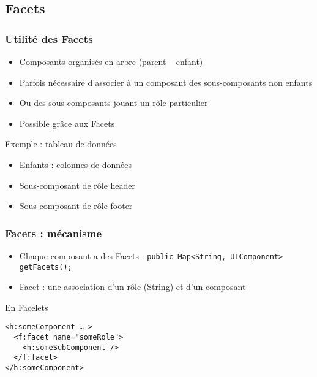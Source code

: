 \documentclass[english, french]{beamer}
\begin{document}
\subsection{Facets}
\begin{frame}
	\frametitle{Utilité des Facets}
	\begin{itemize}
		\item Composants organisés en arbre (parent – enfant)
		\item Parfois nécessaire d’associer à un composant des sous-composants non enfants
		\item Ou des sous-composants jouant un rôle particulier
		\item Possible grâce aux \og{}Facets\fg{}
	\end{itemize}
	\begin{exampleblock}{Exemple : tableau de données}
		\begin{itemize}
			\item Enfants : colonnes de données
			\item Sous-composant de rôle \og{}header\fg{}
			\item Sous-composant de rôle \og{}footer\fg{}
		\end{itemize}		
	\end{exampleblock}
\end{frame}

\begin{frame}[fragile]
	\frametitle{Facets : mécanisme}
	\begin{itemize}
		\item Chaque composant a des Facets : \texttt{public Map<String, UIComponent> getFacets();}
		\item Facet : une association d’un rôle (String) et d’un composant
	\end{itemize}
	\begin{block}{En Facelets}
		\begin{lstlisting}
<h:someComponent … >
  <f:facet name="someRole">
    <h:someSubComponent />
  </f:facet>
</h:someComponent>
		\end{lstlisting}
	\end{block}
\end{frame}
\end{document}
